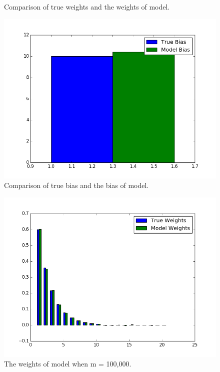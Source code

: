 \documentclass[letter, 12pt]{article}
\begin{document}
\begin{enumerate}
\begin{figure}[H]
\begin{minipage}{.48\textwidth}
    			\caption{Comparison of true weights and the weights of model.}
    			\label{fig:q2-2}
    		\end{minipage}
    		\begin{minipage}{.48\textwidth}
    			\centering
    			\includegraphics[width=\linewidth]{q2-3.png}
    			\caption{Comparison of true bias and the bias of model.}
    			\label{fig:q2-3}
    		\end{minipage}
    	\end{figure}
	    \begin{figure}[H]
		    \centering
		    \centering
		    \includegraphics[width=0.7\linewidth]{q2-4.png}
		    \caption{The weights of model when m = 100,000.}
		    \label{fig:q2-4}
		\end{figure}
    	

\end{enumerate}
\end{document}
